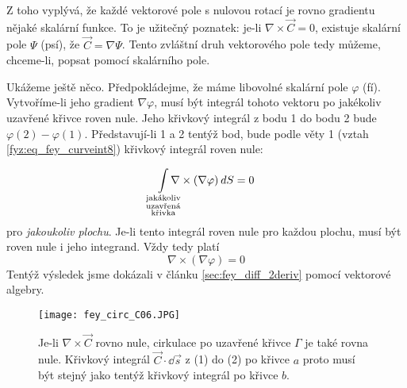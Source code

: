    Z toho vyplývá, že každé vektorové pole s nulovou rotací je rovno gradientu nějaké skalární 
    funkce. To je užitečný poznatek: je-li \(\nabla\times\vec{C}=0\), existuje skalární pole 
    \(\Psi\) (psí), že \(\vec{C}=\nabla\Psi\). Tento zvláštní druh vektorového pole tedy můžeme, 
    chceme-li, popsat pomocí skalárního pole.
    
    Ukážeme ještě něco. Předpokládejme, že máme libovolné skalární pole \(\varphi\) (fí). 
    Vytvoříme-li jeho gradient \(\nabla\varphi\), musí být integrál tohoto vektoru po jakékoliv 
    uzavřené křivce  roven nule. Jeho křivkový integrál z bodu 1 do bodu 2 bude \(\varphi(2) - 
    \varphi(1)\). Představují-li 1 a 2 tentýž bod, bude podle věty 1 (vztah 
    \ref{fyz:eq_fey_curveint8}) křivkový integrál roven nule:
        
    \begin{equation}\label{fyz:eq_fey_null0} 
      \limitint_{\mathclap{\substack{\text{jakákoliv}\\\text{uzavřená}\\\text{křivka}}}}
        \nabla\times(\nabla\varphi)\dd{S} = 0
    \end{equation} 
    pro \emph{jakoukoliv plochu}. Je-li tento integrál roven nule pro každou plochu, musí být 
    roven nule i jeho integrand. Vždy tedy platí
    \begin{equation}
      \nabla\times(\nabla\varphi) = 0
    \end{equation}
    Tentýž výsledek jsme dokázali v článku \ref{sec:fey_diff_2deriv} pomocí vektorové algebry.      
    
    \begin{figure}
      \centering
      \texttt{[image: fey\_circ\_C06.JPG]}
      \caption{Je-li \(\nabla\times\vec{C}\) rovno nule, cirkulace po uzavřené křivce \(\Gamma\) je  
               také rovna nule. Křivkový integrál \(\vec{C}\cdot\dd{\vec{s}}\) z (1) do (2) po 
               křivce \(a\) proto musí být stejný jako tentýž křivkový integrál po křivce \(b\).}
      \label{fyz:fig_fey_circ_C06}
    \end{figure}
        
